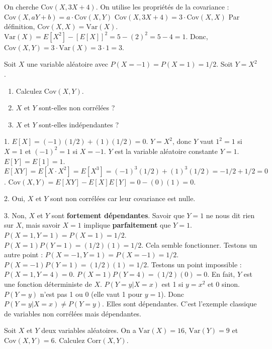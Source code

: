 \begin{correctionbox}
On cherche $\text{Cov}(X, 3X+4)$. On utilise les propriétés de la covariance :
$\text{Cov}(X, aY+b) = a \cdot \text{Cov}(X,Y)$
$\text{Cov}(X, 3X+4) = 3 \cdot \text{Cov}(X,X)$
Par définition, $\text{Cov}(X,X) = \text{Var}(X)$.
$\text{Var}(X) = E[X^2] - [E[X]]^2 = 5 - (2)^2 = 5 - 4 = 1$.
Donc, $\text{Cov}(X,Y) = 3 \cdot \text{Var}(X) = 3 \cdot 1 = 3$.
\end{correctionbox}

\begin{exercicebox}
Soit $X$ une variable aléatoire avec $P(X=-1) = P(X=1) = 1/2$. Soit $Y=X^2$.
\begin{enumerate}
    \item Calculez $\text{Cov}(X,Y)$.
    \item $X$ et $Y$ sont-elles non corrélées ?
    \item $X$ et $Y$ sont-elles indépendantes ?
\end{enumerate}
\end{exercicebox}

\begin{correctionbox}
1. $E[X] = (-1)(1/2) + (1)(1/2) = 0$.
$Y=X^2$, donc $Y$ vaut $1^2=1$ si $X=1$ et $(-1)^2=1$ si $X=-1$. $Y$ est la variable aléatoire constante $Y=1$.
$E[Y] = E[1] = 1$.
$E[XY] = E[X \cdot X^2] = E[X^3] = (-1)^3(1/2) + (1)^3(1/2) = -1/2 + 1/2 = 0$.
$\text{Cov}(X,Y) = E[XY] - E[X]E[Y] = 0 - (0)(1) = 0$.

2. Oui, $X$ et $Y$ sont non corrélées car leur covariance est nulle.

3. Non, $X$ et $Y$ sont \textbf{fortement dépendantes}. Savoir que $Y=1$ ne nous dit rien sur $X$, mais savoir $X=1$ implique \textbf{parfaitement} que $Y=1$.
$P(X=1, Y=1) = P(X=1) = 1/2$.
$P(X=1)P(Y=1) = (1/2)(1) = 1/2$.
Cela semble fonctionner. Testons un autre point :
$P(X=-1, Y=1) = P(X=-1) = 1/2$.
$P(X=-1)P(Y=1) = (1/2)(1) = 1/2$.
Testons un point impossible :
$P(X=1, Y=4) = 0$.
$P(X=1)P(Y=4) = (1/2)(0) = 0$.
En fait, $Y$ est une fonction déterministe de $X$. $P(Y=y | X=x)$ est 1 si $y=x^2$ et 0 sinon. $P(Y=y)$ n'est pas 1 ou 0 (elle vaut 1 pour $y=1$). Donc $P(Y=y | X=x) \neq P(Y=y)$. Elles sont dépendantes. C'est l'exemple classique de variables non corrélées mais dépendantes.
\end{correctionbox}

\begin{exercicebox}[Corrélation - 1]
Soit $X$ et $Y$ deux variables aléatoires. On a $\text{Var}(X)=16$, $\text{Var}(Y)=9$ et $\text{Cov}(X,Y)=6$. Calculez $\text{Corr}(X,Y)$.
\end{exercicebox}

